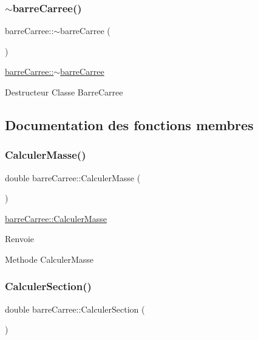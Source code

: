 \subsubsection{\texorpdfstring{$\sim$barre\+Carree()}{~barreCarree()}}
{\footnotesize\ttfamily barre\+Carree\+::$\sim$barre\+Carree (\begin{DoxyParamCaption}{ }\end{DoxyParamCaption})}



\hyperlink{classbarre_carree_a586fa64f84b0d977472f520222ae7554}{barre\+Carree\+::$\sim$barre\+Carree} 

Destructeur Classe Barre\+Carree 

\subsection{Documentation des fonctions membres}
\mbox{\label{classbarre_carree_abc27ea4b81f19f699656dd0c037938ae}} 
\subsubsection{\texorpdfstring{Calculer\+Masse()}{CalculerMasse()}}
{\footnotesize\ttfamily double barre\+Carree\+::\+Calculer\+Masse (\begin{DoxyParamCaption}{ }\end{DoxyParamCaption})}



\hyperlink{classbarre_carree_abc27ea4b81f19f699656dd0c037938ae}{barre\+Carree\+::\+Calculer\+Masse} 

\begin{DoxyReturn}{Renvoie}

\end{DoxyReturn}
Methode Calculer\+Masse \mbox{\label{classbarre_carree_ab7965489abcbac7f9e7d108f801c95e0}} 
\subsubsection{\texorpdfstring{Calculer\+Section()}{CalculerSection()}}
{\footnotesize\ttfamily double barre\+Carree\+::\+Calculer\+Section (\begin{DoxyParamCaption}{ }\end{DoxyParamCaption})}



